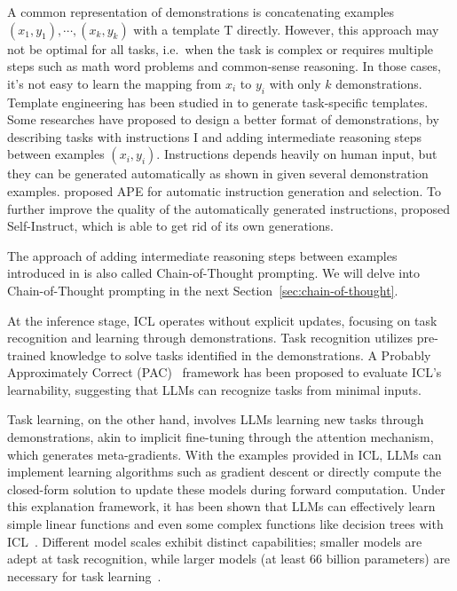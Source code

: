 A common representation of demonstrations is concatenating examples $(x_1, y_1), \cdots, (x_k, y_k)$ with a template T directly.
However, this approach may not be optimal for all tasks, i.e.\ when the task is complex or requires multiple steps such as math word problems and common-sense reasoning.
In those cases, it's not easy to learn the mapping from $x_i$ to $y_i$ with only $k$ demonstrations.
Template engineering has been studied in \textcite{liu2021pretrain, liu2022good} to generate task-specific templates.
Some researches have proposed to design a better format of demonstrations, by describing tasks with instructions I and adding intermediate reasoning steps between examples $(x_i, y_i)$.
Instructions depends heavily on human input, but they can be generated automatically as shown in \textcite{honovich2022instruction} given several demonstration examples.
\textcite{zhou2023large} proposed APE for automatic instruction generation and selection.
To further improve the quality of the automatically generated instructions, \textcite{wang2022selfinstruct} proposed Self-Instruct, which is able to get rid of its own generations.

The approach of adding intermediate reasoning steps between examples introduced in \textcite{wang2023large} is also called Chain-of-Thought prompting.
We will delve into Chain-of-Thought prompting in the next Section~\ref{sec:chain-of-thought}.

At the inference stage, ICL operates without explicit updates, focusing on task recognition and learning through demonstrations.
Task recognition utilizes pre-trained knowledge to solve tasks identified in the demonstrations.
A Probably Approximately Correct (PAC)~\cite{wies2023learnability} framework has been proposed to evaluate ICL’s learnability, suggesting that LLMs can recognize tasks from minimal inputs.

Task learning, on the other hand, involves LLMs learning new tasks through demonstrations, akin to implicit fine-tuning through the attention mechanism, which generates meta-gradients.
With the examples provided in ICL, LLMs can implement learning algorithms such as gradient descent or directly compute the closed-form solution to update these models during forward computation.
Under this explanation framework, it has been shown that LLMs can effectively learn simple linear functions and even some complex functions like decision trees with ICL~\cite{akyurek2022what}.
Different model scales exhibit distinct capabilities; smaller models are adept at task recognition, while larger models (at least 66 billion parameters) are necessary for task learning~\cite{pan2023what}.

